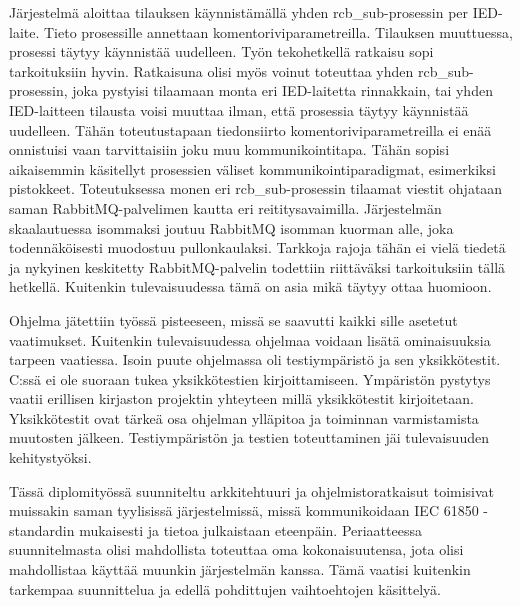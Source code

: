 Järjestelmä aloittaa tilauksen käynnistämällä yhden rcb\_sub-prosessin per IED-laite. Tieto prosessille annettaan komentoriviparametreilla. Tilauksen muuttuessa, prosessi täytyy käynnistää uudelleen. Työn tekohetkellä ratkaisu sopi tarkoituksiin hyvin. Ratkaisuna olisi myös voinut toteuttaa yhden rcb\_sub-prosessin, joka pystyisi tilaamaan monta eri IED-laitetta rinnakkain, tai yhden IED-laitteen tilausta voisi muuttaa ilman, että prosessia täytyy käynnistää uudelleen. Tähän toteutustapaan tiedonsiirto komentoriviparametreilla ei enää onnistuisi vaan tarvittaisiin joku muu kommunikointitapa. Tähän sopisi aikaisemmin käsitellyt prosessien väliset kommunikointiparadigmat, esimerkiksi pistokkeet. Toteutuksessa monen eri rcb\_sub-prosessin tilaamat viestit ohjataan saman RabbitMQ-palvelimen kautta eri reititysavaimilla. Järjestelmän skaalautuessa isommaksi joutuu RabbitMQ isomman kuorman alle, joka todennäköisesti muodostuu pullonkaulaksi. Tarkkoja rajoja tähän ei vielä tiedetä ja nykyinen keskitetty RabbitMQ-palvelin todettiin riittäväksi tarkoituksiin tällä hetkellä. Kuitenkin tulevaisuudessa tämä on asia mikä täytyy ottaa huomioon.

Ohjelma jätettiin työssä pisteeseen, missä se saavutti kaikki sille asetetut vaatimukset. Kuitenkin tulevaisuudessa ohjelmaa voidaan lisätä ominaisuuksia tarpeen vaatiessa. Isoin puute ohjelmassa oli testiympäristö ja sen yksikkötestit. C:ssä ei ole suoraan tukea yksikkötestien kirjoittamiseen. Ympäristön pystytys vaatii erillisen kirjaston projektin yhteyteen millä yksikkötestit kirjoitetaan. Yksikkötestit ovat tärkeä osa ohjelman ylläpitoa ja toiminnan varmistamista muutosten jälkeen. Testiympäristön ja testien toteuttaminen jäi tulevaisuuden kehitystyöksi.

Tässä diplomityössä suunniteltu arkkitehtuuri ja ohjelmistoratkaisut toimisivat muissakin saman tyylisissä järjestelmissä, missä kommunikoidaan IEC 61850 -standardin mukaisesti ja tietoa julkaistaan eteenpäin. Periaatteessa suunnitelmasta olisi mahdollista toteuttaa oma kokonaisuutensa, jota olisi mahdollistaa käyttää muunkin järjestelmän kanssa. Tämä vaatisi kuitenkin tarkempaa suunnittelua ja edellä pohdittujen vaihtoehtojen käsittelyä.